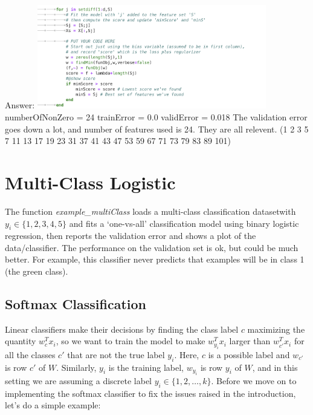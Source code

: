 \documentclass{article}
\def\ans#1{\par\gre{Answer: #1}}
\def\gre#1{{\color{gre}#1}}
\def\red#1{{\color{red}#1}}
\begin{document}
\ans{
    \includegraphics[width=10cm]{Q24.png}
    numberOfNonZero = 24
trainError = 0.0
validError = 0.018
The validation error goes down a lot, and number of features used is 24. They are all relevent. (1 2 3 5 7 11 13 17 19 23 31 37 41 43 47 53 59 67 71 73 79 83 89 101)
}


\section{Multi-Class Logistic}

The function \emph{example\_multiClass} loads a multi-class classification datasetwith $y_i \in \{1,2,3,4,5\}$ and fits a `one-vs-all' classification model using binary logistic regression, then reports the validation error and shows a plot of the data/classifier. The performance on the validation set is ok, but could be much better. For example, this classifier never  predicts that examples will be in class 1 (the green class).

\subsection{Softmax Classification}

Linear classifiers make their decisions by finding the class label $c$ maximizing the quantity $w_c^Tx_i$, so we want to train the model to make $w_{y_i}^Tx_i$ larger than $w_{c'}^Tx_i$ for all the classes $c'$ that are not the true label $y_i$. 
Here, $c$ is a possible label and $w_{c'}$ is \red{row} $c'$ of $W$. Similarly, $y_i$ is the training label, $w_{y_i}$ is \red{row} $y_i$ of $W$, and in this setting we are assuming a discrete label $y_i \in \{1,2,\dots,k\}$. Before we move on to implementing the softmax classifier to fix the issues raised in the introduction, let's do a simple example:
\end{document}
